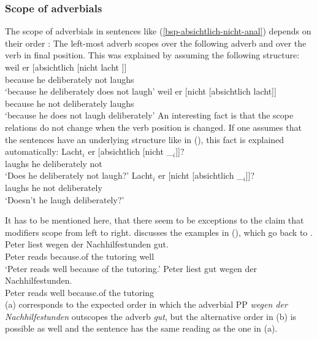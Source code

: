 \subsubsection{Scope of adverbials}

The scope of adverbials in sentences like (\ref{bsp-absichtlich-nicht-anal}) depends on their order \citep[Section~2.3]{Netter92}:
The left-most adverb scopes over the following adverb and over the verb in final
position. This was explained by assuming the following structure:
\eal
\label{bsp-absichtlich-nicht-anal}
\ex 
\gll weil er  [absichtlich [nicht lacht ]]\\
     because he \hspaceThis{[}deliberately \hspaceThis{[}not laughs\\
\glt `because he deliberately does not laugh'
\ex 
\gll weil er [nicht [absichtlich lacht]]\\
     because he \hspaceThis{[}not \hspaceThis{[}deliberately laughs\\
\glt `because he does not laugh deliberately'
\zl
An interesting fact is that the scope relations do not change when the verb position is changed. If
one assumes that the sentences have an underlying structure like in (), this fact is
explained automatically:
\eal
\label{bsp-absichtlich-nicht-anal-v1}
\ex 
\gll Lacht$_i$ er [absichtlich [nicht \_$_i$]]?\\
     laughs he \hspaceThis{[}deliberately \hspaceThis{[}not\\
\glt `Does he deliberately not laugh?'
\ex 
\gll Lacht$_i$ er [nicht [absichtlich \_$_i$]]?\\
     laughs he \hspaceThis{[}not \hspaceThis{[}deliberately\\
\glt `Doesn't he laugh deliberately?'
\zl
\nocite{Hoehle88a,Hoehle97a}


It has to be mentioned here, that there seem to be exceptions to the claim that modifiers scope from
left to right. \citet*[]{Kasper94a} discusses the examples in (), which go back to \citet*[]{BV72}.
\eal
\label{bsp-peter-liest-gut-wegen}
\ex 
\gll Peter liest wegen der Nachhilfestunden gut.\\
     Peter reads because.of the tutoring well\\
\glt `Peter reads well because of the tutoring.'
\ex 
\gll Peter liest gut wegen der Nachhilfestunden.\\
     Peter reads well because.of the tutoring\\
\zl
(a) corresponds to the expected order in which the adverbial PP \emph{wegen der
  Nachhilfestunden} outscopes the adverb \emph{gut}, but the alternative order in (b) is
possible as well and the sentence has the same reading as the one in (a).


